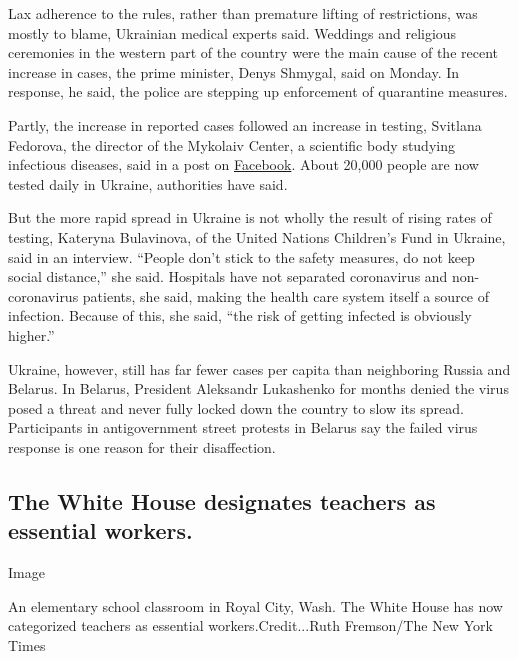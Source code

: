 Lax adherence to the rules, rather than premature lifting of
restrictions, was mostly to blame, Ukrainian medical experts said.
Weddings and religious ceremonies in the western part of the country
were the main cause of the recent increase in cases, the prime minister,
Denys Shmygal, said on Monday. In response, he said, the police are
stepping up enforcement of quarantine measures.

Partly, the increase in reported cases followed an increase in testing,
Svitlana Fedorova, the director of the Mykolaiv Center, a scientific
body studying infectious diseases, said in a post on
\href{https://www.facebookcorewwwi.onion/permalink.php?story_fbid=3694907040522453\&id=100000095792295\&__cft__\%5b0\%5d=AZXpYe_sdzInoWNue3epxKXF_Se-xNs3tBKiqDwQwZUSQXz7mRNrEbKjJuH1vojK9IdZp46gASLqJiFwRt_n52luOvCezvFTpnpWN6P86eqHaJIg9KLqvHUT2tMyGfQdWEU\&__tn__=\%2CO\%2CP-R}{Facebook}.
About 20,000 people are now tested daily in Ukraine, authorities have
said.

But the more rapid spread in Ukraine is not wholly the result of rising
rates of testing, Kateryna Bulavinova, of the United Nations Children's
Fund in Ukraine, said in an interview. ``People don't stick to the
safety measures, do not keep social distance,'' she said. Hospitals have
not separated coronavirus and non-coronavirus patients, she said, making
the health care system itself a source of infection. Because of this,
she said, ``the risk of getting infected is obviously higher.''

Ukraine, however, still has far fewer cases per capita than neighboring
Russia and Belarus. In Belarus, President Aleksandr Lukashenko for
months denied the virus posed a threat and never fully locked down the
country to slow its spread. Participants in antigovernment street
protests in Belarus say the failed virus response is one reason for
their disaffection.

\hypertarget{the-white-house-designates-teachers-as-essential-workers}{%
\subsection{The White House designates teachers as essential
workers.}\label{the-white-house-designates-teachers-as-essential-workers}}

Image

An elementary school classroom in Royal City, Wash. The White House has
now categorized teachers as essential workers.Credit...Ruth Fremson/The
New York Times

